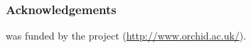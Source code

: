 \documentclass{article} %
\begin{document}



\subsubsection*{Acknowledgements}
\small
{} was funded by the  project (\url{http://www.orchid.ac.uk/}).

\pagebreak


%
%
\end{document}

